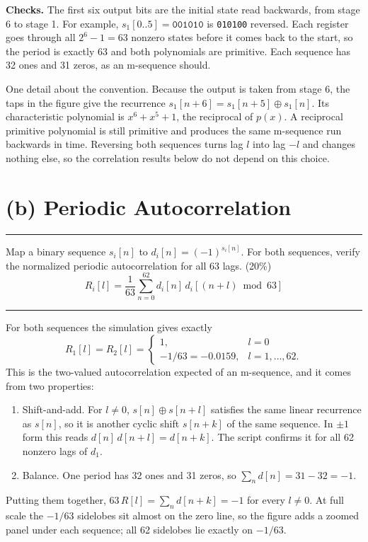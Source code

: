 \documentclass[12pt,a4paper]{report}
\newcommand{\question}[1]{%
    \hrule
    \vspace{0.2cm}
    #1
    \vspace{0.2cm}
    \hrule
    \vspace{0.5cm}
}
\begin{document}
\textbf{Checks.} The first six output bits are the initial state read backwards, from stage 6 to stage 1. For example,
$s_1[0..5] = \texttt{001010}$ is \texttt{010100} reversed. Each register goes through all $2^6 - 1 = 63$ nonzero states
before it comes back to the start, so the period is exactly 63 and both polynomials are primitive. Each sequence has
32 ones and 31 zeros, as an m-sequence should.

One detail about the convention. Because the output is taken from stage 6, the taps in the figure give the recurrence
$s_1[n+6] = s_1[n+5] \oplus s_1[n]$. Its characteristic polynomial is $x^6 + x^5 + 1$, the reciprocal of $p(x)$. A
reciprocal primitive polynomial is still primitive and produces the same m-sequence run backwards in time. Reversing
both sequences turns lag $l$ into lag $-l$ and changes nothing else, so the correlation results below do not depend on
this choice.

\newpage

\section{(b) Periodic Autocorrelation}

\question{Map a binary sequence $s_i[n]$ to $d_i[n] = (-1)^{s_i[n]}$. For both sequences, verify the normalized periodic
autocorrelation for all 63 lags. (20\%)
\[ R_i[l] = \frac{1}{63}\sum_{n=0}^{62} d_i[n]\,d_i[(n+l) \bmod 63] \]}

For both sequences the simulation gives exactly
\begin{equation}
    R_1[l] = R_2[l] =
    \begin{cases}
        1, & l = 0 \\
        -1/63 = -0.0159, & l = 1, \ldots, 62 .
    \end{cases}
\end{equation}
This is the two-valued autocorrelation expected of an m-sequence, and it comes from two properties:
\begin{enumerate}[label=\arabic*)]
    \item Shift-and-add. For $l \neq 0$, $s[n] \oplus s[n+l]$ satisfies the same linear recurrence as $s[n]$, so it
    is another cyclic shift $s[n+k]$ of the same sequence. In $\pm 1$ form this reads $d[n]\,d[n+l] = d[n+k]$. The
    script confirms it for all 62 nonzero lags of $d_1$.
    \item Balance. One period has 32 ones and 31 zeros, so $\sum_n d[n] = 31 - 32 = -1$.
\end{enumerate}
Putting them together, $63\,R[l] = \sum_n d[n+k] = -1$ for every $l \neq 0$. At full scale the $-1/63$ sidelobes sit
almost on the zero line, so the figure adds a zoomed panel under each sequence; all 62 sidelobes lie exactly on
$-1/63$.
\end{document}
